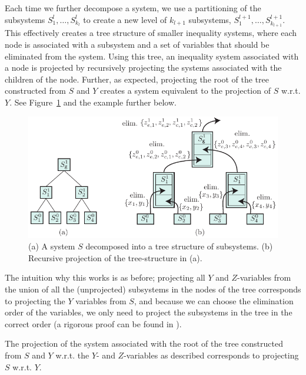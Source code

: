 Each time we further decompose a system, we use a partitioning of the subsystems $S^l_1, \ldots, S^l_{k_l}$ to create a new level of $k_{l+1}$ subsystems, $S^{l+1}_1,\ldots, S^{l+1}_{k_{l+1}}$. This effectively creates a tree structure of smaller inequality systems, where each node is associated with a subsystem and a set of variables that should be eliminated from the system. Using this tree, an inequality system associated with a node is projected by recursively projecting the systems associated with the children of the node. Further, as expected, projecting the root of the tree constructed from $S$ and $Y$ creates a system equivalent to the projection of $S$ w.r.t. $Y$. See Figure~\ref{fig:decomp2} and the example further below.
\begin{figure}
	\centering
		\includegraphics{figures/Example3.pdf}
	\caption{(a) A system $S$ decomposed into a tree structure of subsystems. (b) Recursive projection of the tree-structure in (a).}
	\label{fig:decomp2}
\end{figure}
The intuition why this works is as before; projecting all $Y$ and $Z$-variables from the union of all the (unprojected) subsystems in the nodes of the tree corresponds to projecting the $Y$ variables from $S$, and because we can choose the elimination order of the variables, we only need to project the subsystems in the tree in the correct order (a rigorous proof can be found in \cite{MyTechRep}).

\begin{prop}
The projection of the system associated with the root of the tree constructed from $S$ and $Y$ w.r.t. the $Y$- and $Z$-variables as described corresponds to projecting $S$ w.r.t. $Y$.
\end{prop}

